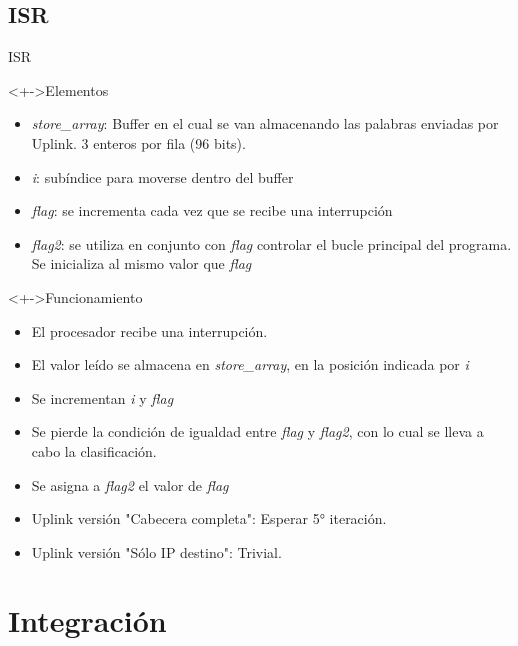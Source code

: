 \documentclass[xcolor=dvipsnames]{beamer}
\begin{document}


\subsection{ISR}
\begin{frame}{ISR}

  \begin{block}<+->{Elementos} 	
    \begin{itemize}
      \scriptsize
     	\item \textit{store\_array}: Buffer en el cual se van almacenando las palabras enviadas por Uplink. 3 enteros por fila (96 bits).
	\item \textit{i}: subíndice para moverse dentro del buffer
	\item \textit{flag}: se incrementa cada vez que se recibe una interrupción
	\item \textit{flag2}: se utiliza en conjunto con \textit{flag} controlar el bucle principal del programa. Se inicializa al mismo valor que \textit{flag}
     \end{itemize}
  \end{block}

  \begin{block}<+->{Funcionamiento} 	
    \begin{itemize}
      \scriptsize
     	\item El procesador recibe una interrupción.
	\item El valor leído se almacena en \textit{store\_array}, en la posición indicada por \textit{i}
	\item Se incrementan \textit{i} y \textit{flag}
	\item Se pierde la condición de igualdad entre \textit{flag} y \textit{flag2}, con lo cual se lleva a cabo la clasificación.
	\item Se asigna a \textit{flag2} el valor de \textit{flag}
	\item Uplink versión "Cabecera completa": Esperar 5° iteración.
	\item Uplink versión "Sólo IP destino": Trivial.
     \end{itemize}
  \end{block}
\end{frame}
  

\section{Integración}
\end{document}
